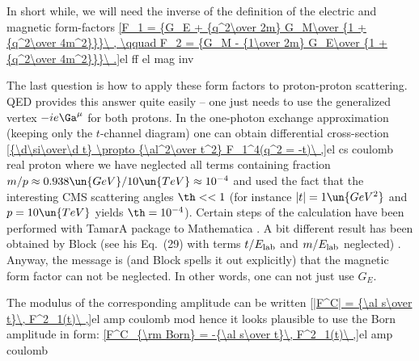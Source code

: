 In short while, we will need the inverse of the definition of the electric and magnetic form-factors
\eqref{F_1 = {G_E + {q^2\over 2m} G_M\over {1 + {q^2\over 4m^2}}}\ , \qquad F_2 = {G_M - {1\over 2m} G_E\over {1 + {q^2\over 4m^2}}}\ .}{el ff el mag inv}

The last question is how to apply these form factors to proton-proton scattering. QED provides this answer quite easily -- one just needs to use the generalized vertex $-ie\Ga^\mu$ for both protons. In the one-photon exchange approximation (keeping only the $t$-channel diagram) one can obtain differential cross-section
\eqref{{\d\si\over\d t} \propto {\al^2\over t^2} F_1^4(q^2 = -t)\ ,}{el cs coulomb real proton}
where we have neglected all terms containing fraction $m/p\approx 0.938\un{GeV}/10\un{TeV}\approx 10^{-4}$ and used the fact that the interesting CMS scattering angles $\th<<1$ (for instance $|t|=1\un{GeV^2}$ and $p=10\un{TeV}$ yields $\th=10^{-4}$). Certain steps of the calculation have been performed with TamarA package  to Mathematica . A bit different result has been obtained by Block  (see his Eq.~(29) with terms $t/E_{\rm lab}$ and $m/E_{\rm lab}$ neglected) . Anyway, the message is (and Block spells it out explicitly) that the magnetic form factor can not be neglected. In other words, one can not just use $G_E$. 


The modulus of the corresponding amplitude can be written
\eqref{|F^C| = {\al s\over t}\, F^2_1(t)\ ,}{el amp coulomb mod}
hence it looks plausible to use the Born amplitude in form:
\eqref{F^C_{\rm Born} = -{\al s\over t}\, F^2_1(t)\ ,}{el amp coulomb}

